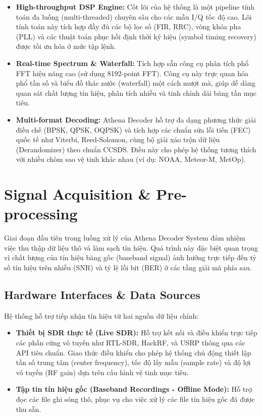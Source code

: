 \documentclass[11pt,a4paper]{article}
\begin{document}
\begin{itemize}
    \item \textbf{High-throughput DSP Engine:} Cốt lõi của hệ thống là một pipeline tính toán đa luồng (multi-threaded) chuyên sâu cho các mẫu I/Q tốc độ cao. Lõi tính toán này tích hợp đầy đủ các bộ lọc số (FIR, RRC), vòng khóa pha (PLL) và các thuật toán phục hồi định thời ký hiệu (symbol timing recovery) được tối ưu hóa ở mức tập lệnh.
    \item \textbf{Real-time Spectrum \& Waterfall:} Tích hợp sẵn công cụ phân tích phổ FFT hiệu năng cao (sử dụng 8192-point FFT). Công cụ này trực quan hóa phổ tần số và biểu đồ thác nước (waterfall) một cách mượt mà, giúp dễ dàng quan sát chất lượng tín hiệu, phân tích nhiễu và tinh chỉnh dải băng tần mục tiêu.
    \item \textbf{Multi-format Decoding:} Athena Decoder hỗ trợ đa dạng phương thức giải điều chế (BPSK, QPSK, OQPSK) và tích hợp các chuẩn sửa lỗi tiến (FEC) quốc tế như Viterbi, Reed-Solomon, cùng bộ giải xáo trộn dữ liệu (Derandomizer) theo chuẩn CCSDS. Điều này cho phép hệ thống tương thích với nhiều chòm sao vệ tinh khác nhau (ví dụ: NOAA, Meteor-M, MetOp).
\end{itemize}

\section{Signal Acquisition \& Pre-processing}
Giai đoạn đầu tiên trong luồng xử lý của Athena Decoder System đảm nhiệm việc thu thập dữ liệu thô và làm sạch tín hiệu. Quá trình này đặc biệt quan trọng vì chất lượng của tín hiệu băng gốc (baseband signal) ảnh hưởng trực tiếp đến tỷ số tín hiệu trên nhiễu (SNR) và tỷ lệ lỗi bit (BER) ở các tầng giải mã phía sau.

\subsection{Hardware Interfaces \& Data Sources}
Hệ thống hỗ trợ tiếp nhận tín hiệu từ hai nguồn dữ liệu chính:
\begin{itemize}
    \item \textbf{Thiết bị SDR thực tế (Live SDR):} Hỗ trợ kết nối và điều khiển trực tiếp các phần cứng vô tuyến như RTL-SDR, HackRF, và USRP thông qua các API tiêu chuẩn. Giao thức điều khiển cho phép hệ thống chủ động thiết lập tần số trung tâm (center frequency), tốc độ lấy mẫu (sample rate) và độ lợi vô tuyến (RF gain) dựa trên cấu hình vệ tinh mục tiêu.
    \item \textbf{Tập tin tín hiệu gốc (Baseband Recordings - Offline Mode):} Hỗ trợ đọc các file ghi sóng thô, phục vụ cho việc xử lý các file tín hiệu gốc đã được thu sẵn.
\end{itemize}
\end{document}
